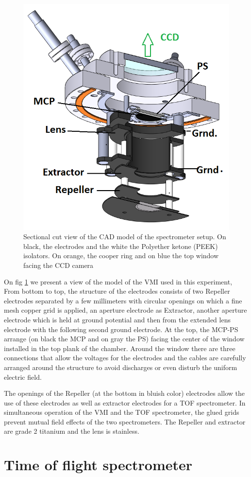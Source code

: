 \begin{figure}[hbtp]
\label{img:mcp cut}
\centering
\includegraphics[width =8 cm]{../Images/MCP cut.png}
\caption[MCP sketch cut]{Sectional cut view of the CAD model of the spectrometer setup. On black, the electrodes and the white the Polyether ketone (PEEK) isolators. On orange, the cooper ring and on blue the top window facing the CCD camera
}
\end{figure}

On fig \ref{img:mcp cut} we present a view of the model of the VMI used in this experiment, From bottom to top, the structure of the electrodes consists of two Repeller electrodes separated by a few millimeters with circular openings on which a fine mesh copper grid is applied, an aperture electrode as Extractor, another aperture electrode which is held at ground potential and then from the extended lens electrode with the following second ground electrode. At the top, the MCP-PS arrange (on black the MCP and on gray the PS) facing the center of the window installed in the top plank of the chamber. Around the window there are three connections that allow the voltages for the electrodes and the cables are carefully arranged around the structure to avoid discharges or even disturb the uniform electric field.

The openings of the Repeller (at the bottom in bluish color) electrodes allow the use of these electrodes as well as extractor electrodes for a TOF spectrometer. In simultaneous operation of the VMI and the TOF spectrometer, the glued grids prevent mutual field effects of the two spectrometers.  The Repeller and extractor are grade 2 titanium and the lens is stainless.

\section{Time of flight spectrometer}

